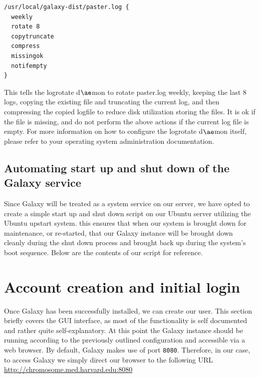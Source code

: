 \documentclass[a4paper,10pt]{article}
\begin{document}
\begin{lstlisting}
/usr/local/galaxy-dist/paster.log {
  weekly
  rotate 8
  copytruncate
  compress
  missingok
  notifempty
}
\end{lstlisting}

This tells the logrotate d$\ae$mon to rotate paster.log weekly, keeping the last 8 logs, copying the existing file and truncating the current log, and then compressing the copied logfile to reduce disk utilization storing the files.  It is ok if the file is missing, and do not perform the above actions if the current log file is empty.  For more information on how to configure the logrotate d$\ae$mon itself, please refer to your operating system administration documentation.

\subsection{Automating start up and shut down of the Galaxy service}
Since Galaxy will be treated as a system service on our server, we have opted to create a simple start up and shut down script on our Ubuntu server utilizing the Ubuntu upstart system.  this ensures that when our system is brought down for maintenance, or re-started, that our Galaxy instance will be brought down cleanly during the shut down process and brought back up during the system's boot sequence.  Below are the contents of our script for reference.



\section{Account creation and initial login}
Once Galaxy has been successfully installed, we can create our user.  This section briefly covers the GUI interface, as most of the functionality is self documented and rather quite self-explanatory.
At this point the Galaxy instance should be running according to the previously outlined configuration and accessible via a web browser.
By default, Galaxy makes use of port \texttt{\footnotesize{8080}}. Therefore, in our case, to access Galaxy we simply direct our browser to the following URL \href{http://chromosome.med.harvard.edu:8080}{http://chromosome.med.harvard.edu:8080}
\end{document}
